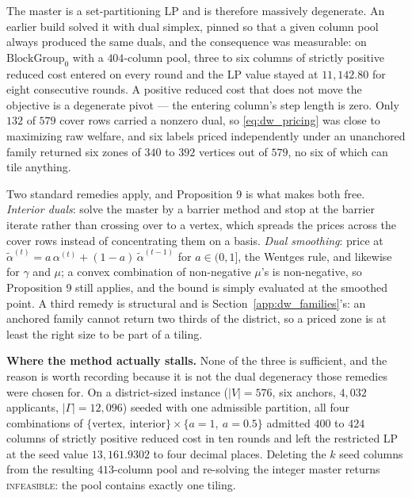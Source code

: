 \documentclass{article}
\begin{document}
The master is a set-partitioning LP and is therefore massively degenerate. An
earlier build solved it with dual simplex, pinned so that a given column pool
always produced the same duals, and the consequence was measurable: on
$\text{BlockGroup}_0$ with a $404$-column pool, three to six columns of
strictly positive reduced cost entered on every round and the LP value stayed at
$11{,}142.80$ for eight consecutive rounds. A positive reduced cost that does
not move the objective is a degenerate pivot --- the entering column's step
length is zero. Only $132$ of $579$ cover rows carried a nonzero dual, so
\eqref{eq:dw_pricing} was close to maximizing raw welfare, and six labels priced
independently under an unanchored family returned six zones of $340$ to $392$
vertices out of $579$, no six of which can tile anything.

Two standard remedies apply, and Proposition 9 is what makes both free.
\emph{Interior duals}: solve the master by a barrier method and stop at the
barrier iterate rather than crossing over to a vertex, which spreads the prices
across the cover rows instead of concentrating them on a basis.
\emph{Dual smoothing}: price at
$\widetilde\alpha^{(t)} = a\,\alpha^{(t)} + (1-a)\,\widetilde\alpha^{(t-1)}$ for
$a \in (0,1]$, the Wentges rule, and likewise for $\gamma$ and $\mu$; a convex
combination of non-negative $\mu$'s is non-negative, so Proposition 9 still
applies, and the bound is simply evaluated at the smoothed point. A third
remedy is structural and is Section~\ref{app:dw_families}'s: an anchored family
cannot return two thirds of the district, so a priced zone is at least the right
size to be part of a tiling.

\noindent\textbf{Where the method actually stalls.}
None of the three is sufficient, and the reason is worth recording because it is
not the dual degeneracy those remedies were chosen for. On a district-sized
instance ($|V| = 576$, six anchors, $4{,}032$ applicants, $|\Gamma| = 12{,}096$)
seeded with one admissible partition, all four combinations of
$\{\text{vertex},\ \text{interior}\} \times \{a = 1,\ a = 0.5\}$ admitted
$400$ to $424$ columns of strictly positive reduced cost in ten rounds and left
the restricted LP at the seed value $13{,}161.9302$ to four decimal places.
Deleting the $k$ seed columns from the resulting $413$-column pool and re-solving
the integer master returns \textsc{infeasible}: the pool contains exactly one
tiling.
\end{document}
